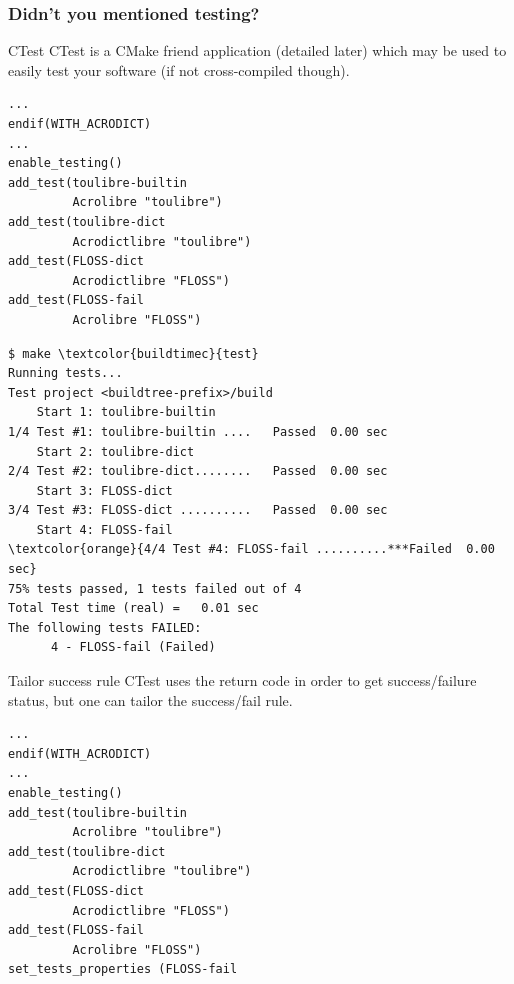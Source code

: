 \documentclass[compress,slidestop,table
              ]
               {beamer}
\begin{document}
\begin{frame}
\frametitle{Didn't you mentioned testing?}
\vspace*{-0.4cm}
\begin{block}{CTest}
CTest is a CMake friend application (detailed later) which may be used to
easily test your software (if not cross-compiled though).
\end{block}
\vspace*{-0.7cm}
\begin{multicols}{2}
\begin{lstlisting}[escapechar={§},basicstyle=\tiny,caption=add CTest support]
...
endif(WITH_ACRODICT)
...
enable_testing()
add_test(toulibre-builtin
         Acrolibre "toulibre")
add_test(toulibre-dict
         Acrodictlibre "toulibre")
add_test(FLOSS-dict
         Acrodictlibre "FLOSS")
add_test(FLOSS-fail
         Acrolibre "FLOSS")
\end{lstlisting}
\columnbreak
\begin{Verbatim}[commandchars=\\\{\},fontsize=\tiny]
$ make \textcolor{buildtimec}{test}
Running tests...
Test project <buildtree-prefix>/build
    Start 1: toulibre-builtin
1/4 Test #1: toulibre-builtin ....   Passed  0.00 sec
    Start 2: toulibre-dict
2/4 Test #2: toulibre-dict........   Passed  0.00 sec
    Start 3: FLOSS-dict
3/4 Test #3: FLOSS-dict ..........   Passed  0.00 sec
    Start 4: FLOSS-fail
\textcolor{orange}{4/4 Test #4: FLOSS-fail ..........***Failed  0.00 sec}
75% tests passed, 1 tests failed out of 4
Total Test time (real) =   0.01 sec
The following tests FAILED:
	  4 - FLOSS-fail (Failed)
\end{Verbatim}
\end{multicols}
\vspace*{-0.4cm}
\begin{block}{Tailor success rule}
CTest uses the return code in order to get success/failure status, but
one can tailor the success/fail rule.
\end{block}
\vspace*{-0.7cm}
\begin{multicols}{2}
\begin{lstlisting}[escapechar={§},basicstyle=\tiny,caption=add CTest support]
...
endif(WITH_ACRODICT)
...
enable_testing()
add_test(toulibre-builtin
         Acrolibre "toulibre")
add_test(toulibre-dict
         Acrodictlibre "toulibre")
add_test(FLOSS-dict
         Acrodictlibre "FLOSS")
add_test(FLOSS-fail
         Acrolibre "FLOSS")
set_tests_properties (FLOSS-fail

\end{lstlisting}
\end{multicols}
\end{frame}
\end{document}
